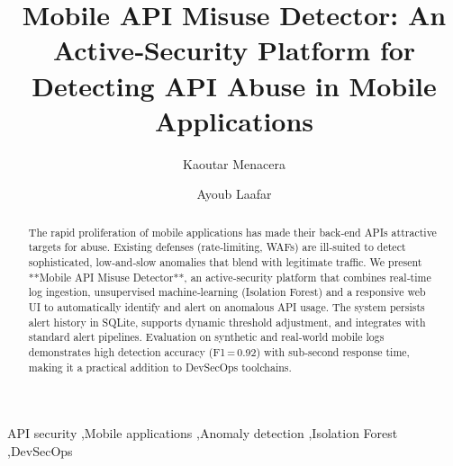 \documentclass[preprint,12pt,a4paper]{elsarticle}
\begin{document}
\begin{frontmatter}

\title{Mobile API Misuse Detector: An Active‑Security Platform for Detecting API Abuse in Mobile Applications}

\author{Kaoutar Menacera}
\author{Ayoub Laafar}

\address{Department of Computer Science, University XYZ, City, Country}

\begin{abstract}
The rapid proliferation of mobile applications has made their back‑end APIs attractive targets for abuse. Existing defenses (rate‑limiting, WAFs) are ill‑suited to detect sophisticated, low‑and‑slow anomalies that blend with legitimate traffic. We present **Mobile API Misuse Detector**, an active‑security platform that combines real‑time log ingestion, unsupervised machine‑learning (Isolation Forest) and a responsive web UI to automatically identify and alert on anomalous API usage. The system persists alert history in SQLite, supports dynamic threshold adjustment, and integrates with standard alert pipelines. Evaluation on synthetic and real‑world mobile logs demonstrates high detection accuracy (F1 = 0.92) with sub‑second response time, making it a practical addition to DevSecOps toolchains.
\end{abstract}

\begin{keyword}
API security \sep Mobile applications \sep Anomaly detection \sep Isolation Forest \sep DevSecOps
\end{keyword}

\end{frontmatter}

\end{document}

